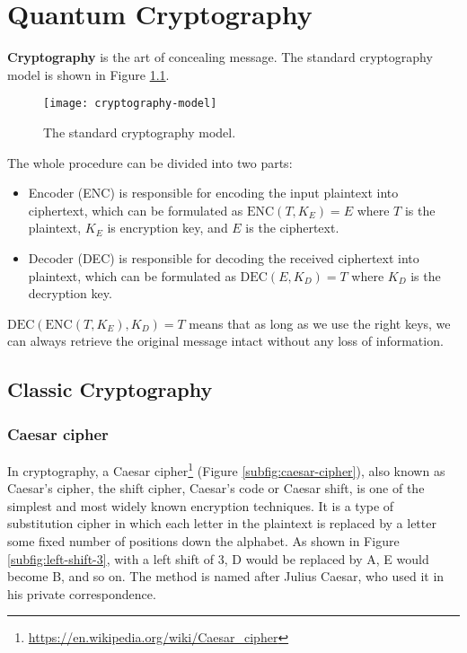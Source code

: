 \documentclass{easyclass}
\begin{document}
\else
	\chapter{Quantum Cryptography}
\fi

\textbf{Cryptography} is the art of concealing message. The standard cryptography model is shown in Figure \ref{fig:cryptography model}. 

\begin{figure}[h]
	\centering
	\texttt{[image: cryptography-model]}
	\caption{The standard cryptography model.}
	\label{fig:cryptography model}
\end{figure}
	
The whole procedure can be divided into two parts:
\begin{itemize}
	\item Encoder (ENC) is responsible for encoding the input plaintext into ciphertext, which can be formulated as $\textrm{ENC}(T,K_{E})=E$ where $T$ is the plaintext, $K_E$ is encryption key, and $E$ is the ciphertext.
	
	\item Decoder (DEC) is responsible for decoding the received ciphertext into plaintext, which can be formulated as $\textrm{DEC}(E, K_D)=T$ where $K_D$ is the decryption key.
\end{itemize}
$\textrm{DEC}(\textrm{ENC}(T, K_E), K_D)=T$ means that as long as we use the right keys, we can always retrieve the original message intact without any loss of information.

\section{Classic Cryptography}
\subsection{Caesar cipher}
In cryptography, a Caesar cipher\footnote{\url{https://en.wikipedia.org/wiki/Caesar_cipher}} (Figure \ref{subfig:caesar-cipher}), also known as Caesar's cipher, the shift cipher, Caesar's code or Caesar shift, is one of the simplest and most widely known encryption techniques. It is a type of substitution cipher in which each letter in the plaintext is replaced by a letter some fixed number of positions down the alphabet. As shown in Figure \ref{subfig:left-shift-3}, with a left shift of 3, D would be replaced by A, E would become B, and so on. The method is named after Julius Caesar, who used it in his private correspondence.
\end{document}
